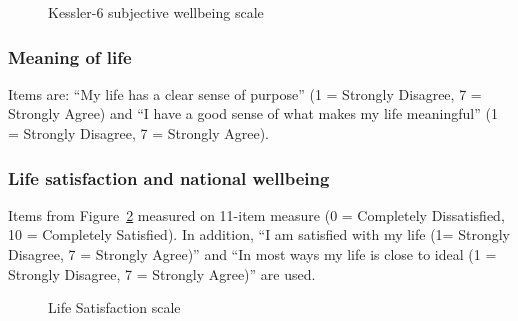 \documentclass[
]{interact}
\begin{document}
\begin{figure}


\caption{\label{fig-Kess-6}Kessler-6 subjective wellbeing scale}

\end{figure}%

\subsubsection{Meaning of life}\label{meaning-of-life}

Items are: ``My life has a clear sense of purpose'' (1 = Strongly
Disagree, 7 = Strongly Agree) and ``I have a good sense of what makes my
life meaningful'' (1 = Strongly Disagree, 7 = Strongly Agree).

\subsubsection{Life satisfaction and national
wellbeing}\label{life-satisfaction-and-national-wellbeing}

Items from Figure~\ref{fig-life-sat} measured on 11-item measure (0 =
Completely Dissatisfied, 10 = Completely Satisfied). In addition, ``I am
satisfied with my life (1= Strongly Disagree, 7 = Strongly Agree)'' and
``In most ways my life is close to ideal (1 = Strongly Disagree, 7 =
Strongly Agree)'' are used.

\begin{figure}


\caption{\label{fig-life-sat}Life Satisfaction scale}

\end{figure}%
\end{document}
